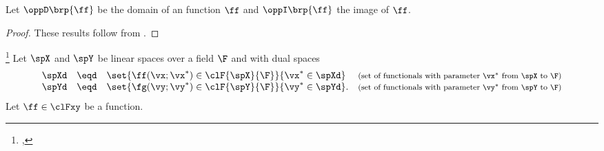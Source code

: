 {%
\begin{theorem}
\label{thm:op_DU}
Let $\oppD\brp{\ff}$ be the domain of an function $\ff$ and $\oppI\brp{\ff}$ the image of $\ff$.
\end{theorem}
\begin{proof}
These results follow from .
\end{proof}

\begin{definition}
\label{def:op_conjugate}
\footnote{
  ,
  }
Let $\spX$ and $\spY$ be linear spaces over a field $\F$ and with
dual spaces
  \[\begin{array}{rcl@{\quad}l}
    \spXd &\eqd& \set{\ff(\vx;\vx^\ast)\in\clF{\spX}{\F}}{\vx^\ast\in\spXd}
    & \text{\footnotesize(set of functionals with parameter $\vx^\ast$ from $\spX$ to $\F$)}
    \\
    \spYd &\eqd& \set{\fg(\vy;\vy^\ast)\in\clF{\spY}{\F}}{\vy^\ast\in\spYd}.
    & \text{\footnotesize(set of functionals with parameter $\vy^\ast$ from $\spY$ to $\F$)}
  \end{array}\]
Let $\ff\in\clFxy$ be a function.
\end{definition}

} %

